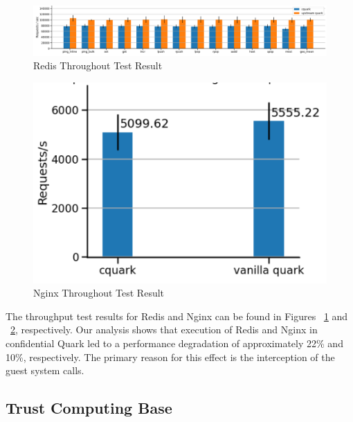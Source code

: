 \begin{figure}[H]
    \centering
    \includegraphics[width=1\textwidth]{images/redis_throughput.PNG}
    \caption[Redis Throughout Test]{Redis Throughout Test Result}
    \label{fig:redis_throughput}
\end{figure}


\begin{figure}[H]
    \centering
    \includegraphics[width=1\textwidth]{images/nginx_throughput.PNG}
    \caption[Nginx Throughout Test]{Nginx Throughout Test Result}
    \label{fig:nginx_throughput}
\end{figure}


The throughput test results for Redis\cite*{redis} and Nginx\cite*{nginx} can be found in Figures ~\ref{fig:redis_throughput} and  ~\ref{fig:nginx_throughput}, respectively. Our analysis shows that execution of Redis and Nginx in confidential Quark led to a performance degradation of 
approximately 22\% and 10\%, respectively. The primary reason for this effect is the interception of the guest system calls.



\subsection{Trust Computing Base}\label{tcb}

